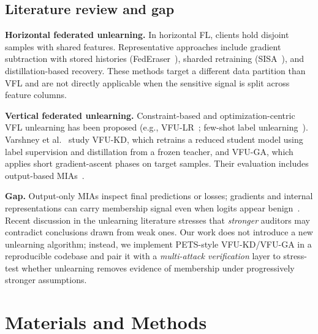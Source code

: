 \documentclass[sigconf,screen]{acmart}
\begin{document}
\subsection{Literature review and gap}
\textbf{Horizontal federated unlearning.} In horizontal FL, clients hold disjoint samples with shared features. Representative approaches include gradient subtraction with stored histories (FedEraser~\cite{liu2021federaser}), sharded retraining (SISA~\cite{bourtoule2021sisa}), and distillation-based recovery. These methods target a different data partition than VFL and are not directly applicable when the sensitive signal is split across feature columns.

\textbf{Vertical federated unlearning.} Constraint-based and optimization-centric VFL unlearning has been proposed (e.g., VFU-LR~\cite{deng2023vfulr}; few-shot label unlearning~\cite{gu2024fewshot}). Varshney et al.~\cite{varshney2025vertical} study \textsc{VFU-KD}, which retrains a reduced student model using label supervision and distillation from a frozen teacher, and \textsc{VFU-GA}, which applies short gradient-ascent phases on target samples. Their evaluation includes output-based MIAs~\cite{shokri2017membership}.

\textbf{Gap.} Output-only MIAs inspect final predictions or losses; gradients and internal representations can carry membership signal even when logits appear benign~\cite{geiping2020inverting}. Recent discussion in the unlearning literature stresses that \emph{stronger} auditors may contradict conclusions drawn from weak ones. Our work does not introduce a new unlearning algorithm; instead, we implement PETS-style \textsc{VFU-KD}/\textsc{VFU-GA} in a reproducible codebase and pair it with a \emph{multi-attack verification} layer to stress-test whether unlearning removes evidence of membership under progressively stronger assumptions.

\section{Materials and Methods}
\end{document}
